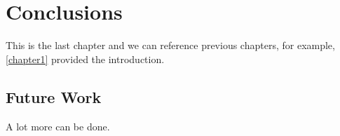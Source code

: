 \chapter{Conclusions} \label{chapter4}

This is the last chapter and we can reference previous chapters, for example,
\autoref{chapter1} provided the introduction.

\section{Future Work} \label{futurework}

A lot more can be done.
